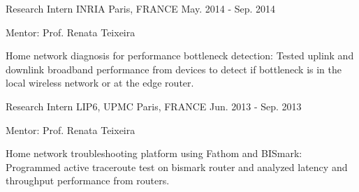 \begin{cventries}
  \cventry
    {Research Intern} %
    {INRIA} %
    {Paris, FRANCE} %
    {May. 2014 - Sep. 2014} %
    {
      \begin{cvitems} %
    \item {Mentor: Prof. Renata Teixeira}
    \item {Home network diagnosis for performance bottleneck detection: Tested uplink and downlink broadband performance from devices to detect if bottleneck is in the local wireless network or at the edge router.}
      \end{cvitems}
    }
    
  \cventry
    {Research Intern} %
    {LIP6, UPMC} %
    {Paris, FRANCE} %
    {Jun. 2013 - Sep. 2013} %
    {
      \begin{cvitems} %
    \item {Mentor: Prof. Renata Teixeira}
    \item {Home network troubleshooting platform using Fathom and BISmark: Programmed active traceroute test on bismark router and analyzed latency and throughput performance from routers.}
      \end{cvitems}
    }


\end{cventries}

